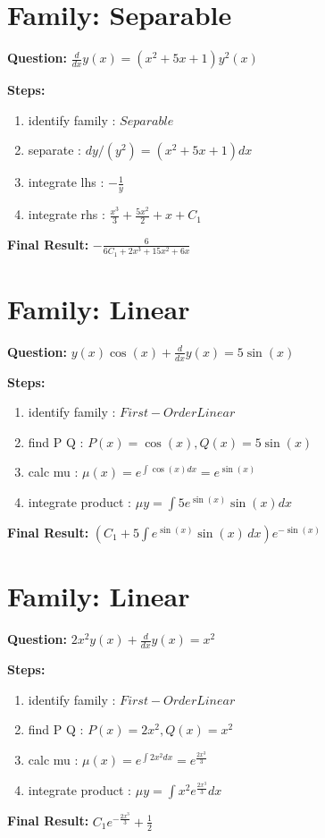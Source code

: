 \documentclass{article}
\begin{document}
\section*{Family: Separable}
\textbf{Question:} $\frac{d}{d x} y{\left(x \right)} = \left(x^{2} + 5 x + 1\right) y^{2}{\left(x \right)}$

\textbf{Steps:}
\begin{enumerate}
\item identify family :  $Separable$
\item separate :  $dy / (y^{2}) = (x^{2} + 5 x + 1) dx$
\item integrate lhs :  $- \frac{1}{y}$
\item integrate rhs :  $\frac{x^{3}}{3} + \frac{5 x^{2}}{2} + x + C_1$
\end{enumerate}
\textbf{Final Result:} $- \frac{6}{6 C_{1} + 2 x^{3} + 15 x^{2} + 6 x}$

\section*{Family: Linear}
\textbf{Question:} $y{\left(x \right)} \cos{\left(x \right)} + \frac{d}{d x} y{\left(x \right)} = 5 \sin{\left(x \right)}$

\textbf{Steps:}
\begin{enumerate}
\item identify family :  $First-Order Linear$
\item find P Q :  $P(x)=\cos{\left(x \right)}, Q(x)=5 \sin{\left(x \right)}$
\item calc mu :  $\mu(x) = e^{\int \cos{\left(x \right)} dx} = e^{\sin{\left(x \right)}}$
\item integrate product :  $\mu y = \int 5 e^{\sin{\left(x \right)}} \sin{\left(x \right)} dx$
\end{enumerate}
\textbf{Final Result:} $\left(C_{1} + 5 \int e^{\sin{\left(x \right)}} \sin{\left(x \right)}\, dx\right) e^{- \sin{\left(x \right)}}$

\section*{Family: Linear}
\textbf{Question:} $2 x^{2} y{\left(x \right)} + \frac{d}{d x} y{\left(x \right)} = x^{2}$

\textbf{Steps:}
\begin{enumerate}
\item identify family :  $First-Order Linear$
\item find P Q :  $P(x)=2 x^{2}, Q(x)=x^{2}$
\item calc mu :  $\mu(x) = e^{\int 2 x^{2} dx} = e^{\frac{2 x^{3}}{3}}$
\item integrate product :  $\mu y = \int x^{2} e^{\frac{2 x^{3}}{3}} dx$
\end{enumerate}
\textbf{Final Result:} $C_{1} e^{- \frac{2 x^{3}}{3}} + \frac{1}{2}$
\end{document}

